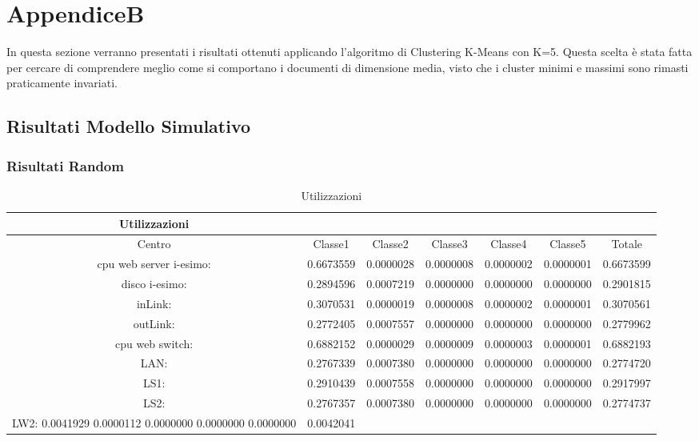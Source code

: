 \chapter{AppendiceB}\label{appendiceB}
In questa sezione verranno presentati i risultati ottenuti applicando l'algoritmo di Clustering K-Means con K=5. Questa scelta è stata fatta per cercare di comprendere meglio come si comportano i documenti di dimensione media, visto che i cluster minimi e massimi sono rimasti praticamente invariati. 
\section{Risultati Modello Simulativo}
\subsection{Risultati Random}
\begin{table}[H]
\begin{center}
\begin{tabular}{||c|c|c|c|c|c|c||}
\hline
Utilizzazioni\\
\hline
Centro &Classe1 &Classe2 &Classe3 &Classe4 &Classe5 &Totale\\
\hline
\hline
 cpu web server i-esimo: 	&0.6673559	&0.0000028	&0.0000008	&0.0000002	&0.0000001	&0.6673599\\
\hline
 disco i-esimo: 	&0.2894596	&0.0007219	&0.0000000	&0.0000000	&0.0000000	&0.2901815\\
\hline
 inLink: 	&0.3070531	&0.0000019	&0.0000008	&0.0000002	&0.0000001	&0.3070561\\
\hline
 outLink: 	&0.2772405	&0.0007557	&0.0000000	&0.0000000	&0.0000000	&0.2779962\\
\hline
 cpu web switch: 	&0.6882152	&0.0000029	&0.0000009	&0.0000003	&0.0000001	&0.6882193\\
\hline
 LAN: 	&0.2767339	&0.0007380	&0.0000000	&0.0000000	&0.0000000	&0.2774720\\
\hline
 LS1: 	&0.2910439	&0.0007558	&0.0000000	&0.0000000	&0.0000000	&0.2917997\\
\hline
 LS2:	&0.2767357	&0.0007380	&0.0000000	&0.0000000	&0.0000000	&0.2774737\\
\hline
 LW2: 	0.0041929	0.0000112	0.0000000	0.0000000	0.0000000	&0.0042041\\
\hline
\end{tabular}
\end{center}
\caption{Utilizzazioni}
\label{risrandom}
\end{table}

